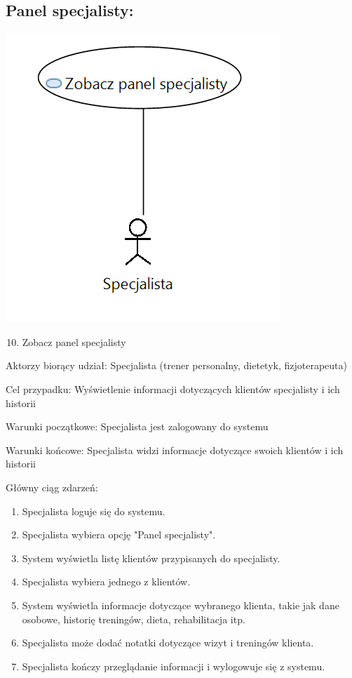 \documentclass[
]{article}
\providecommand{\tightlist}{%
  \setlength{\itemsep}{0pt}\setlength{\parskip}{0pt}}
\begin{document}
\hypertarget{h.8of6ai7v3sbh}{%
\subsection{\texorpdfstring{{Panel
specjalisty:}}{Panel specjalisty:}}\label{h.8of6ai7v3sbh}}

{\includegraphics{diagrams/use_cases/zobacz_panel_specjalisty.png}}

\begin{enumerate}
\setcounter{enumi}{9}
\tightlist
\item
  {Zobacz panel specjalisty}
\end{enumerate}

{Aktorzy biorący udział: Specjalista (trener personalny, dietetyk,
fizjoterapeuta)}

{Cel przypadku: Wyświetlenie informacji dotyczących klientów specjalisty
i ich historii}

{Warunki początkowe: Specjalista jest zalogowany do systemu}

{Warunki końcowe: Specjalista widzi informacje dotyczące swoich klientów
i ich historii}

{Główny ciąg zdarzeń:}

\begin{enumerate}
\tightlist
\item
  {Specjalista loguje się do systemu.}
\item
  {Specjalista wybiera opcję "Panel specjalisty".}
\item
  {System wyświetla listę klientów przypisanych do specjalisty.}
\item
  {Specjalista wybiera jednego z klientów.}
\item
  {System wyświetla informacje dotyczące wybranego klienta, takie jak
  dane osobowe, historię treningów, dieta, rehabilitacja itp.}
\item
  {Specjalista może dodać notatki dotyczące wizyt i treningów klienta.}
\item
  {Specjalista kończy przeglądanie informacji i wylogowuje się z
  systemu.}
\end{enumerate}
\end{document}
